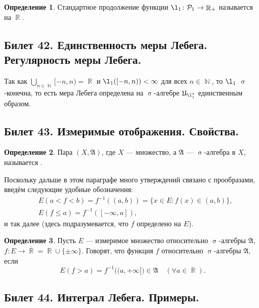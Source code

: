 \documentclass[a4paper]{article}
\theoremstyle{indented}
\theoremstyle{definition}
\newtheorem{defn}{Определение}
\theoremstyle{remark}
\DeclareMathOperator{\RR}{\mathbb{R}}
\DeclareMathOperator{\NN}{\mathbb{N}}
\DeclareMathOperator{\s}{\sigma}
\begin{document}
\begin{defn}
	Стандартное продолжение функции $ \l_1\colon\mathcal{P}_1\to\RR_+ $ называется  на $ \RR $. 
\end{defn}



\subsection{Билет 42. Единственность меры Лебега. Регулярность меры Лебега.}

Так как $ \bigcup_{n\in\NN}[-n,n)=\RR $ и $ \l_1([-n,n))<\infty $ для всех $ n\in\NN $, то $ \l_1 $ $ \s $-конечна, то есть мера Лебега определена на $ \s $-алгебре $ \mathfrak{U}_{\l_1^*} $ единственным образом.

\subsection{Билет 43. Измеримые отображения. Свойства.} 

\begin{defn}
	Пара $ (X,\mathfrak{A}) $, где
	$ X $ --- множество, а $ \mathfrak{A} $ --- $ \s $-алгебра в $ X $,  называется . 
\end{defn}

Поскольку дальше в этом параграфе много утверждений связано с прообразами, введём следующие удобные обозначения:
\begin{align*}
&E(a<f<b)=f^{-1}((a,b))=\{x\in E : f(x)\in (a,b)\},\\
&E(f\le a)=f^{-1}([-\infty,a]),
\end{align*}
и так далее (здесь подразумевается, что $ f $ определено на $ E $).

\begin{defn}
	Пусть $ E $ --- измеримое множество относительно $ \s $-алгебры $ \mathfrak{A} $, $ f\colon E\to \overline{\RR}=\RR\cup\{\pm\infty\} $. Говорят, что функция $ f $  относительно $ \s $-алгебры $ \mathfrak{A} $, если
	\begin{equation*}
		E(f>a)=f^{-1}\big((a,+\infty]\big)\in\mathfrak{A}\quad(\forall a\in\RR).
	\end{equation*}
\end{defn}

\subsection{Билет 44. Интеграл Лебега. Примеры.}
\end{document}

